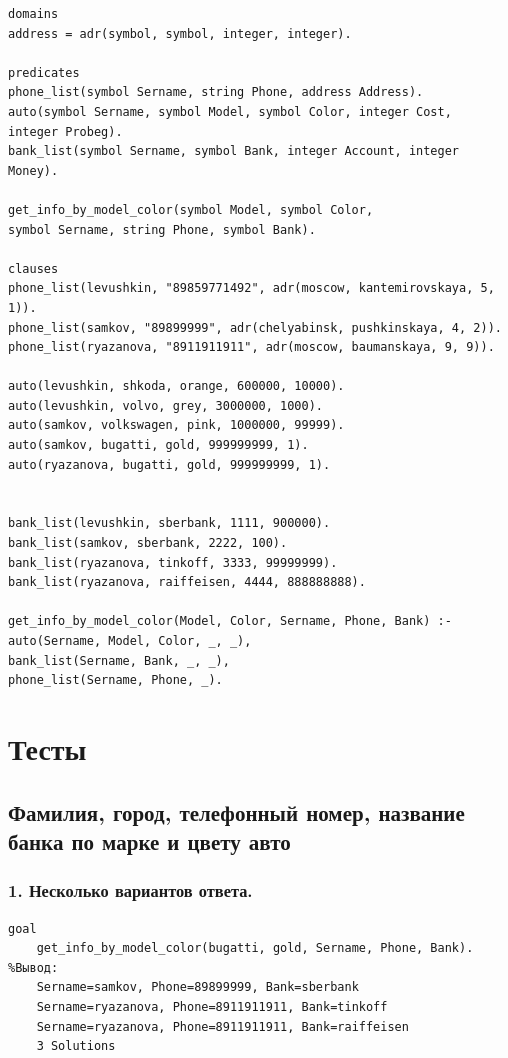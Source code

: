 \documentclass[a4paper,12pt]{article}
\begin{document}
	\begin{verbatim}
domains
address = adr(symbol, symbol, integer, integer).

predicates
phone_list(symbol Sername, string Phone, address Address).
auto(symbol Sername, symbol Model, symbol Color, integer Cost, 
integer Probeg).
bank_list(symbol Sername, symbol Bank, integer Account, integer Money).

get_info_by_model_color(symbol Model, symbol Color, 
symbol Sername, string Phone, symbol Bank).

clauses
phone_list(levushkin, "89859771492", adr(moscow, kantemirovskaya, 5, 1)).
phone_list(samkov, "89899999", adr(chelyabinsk, pushkinskaya, 4, 2)).
phone_list(ryazanova, "8911911911", adr(moscow, baumanskaya, 9, 9)).

auto(levushkin, shkoda, orange, 600000, 10000).
auto(levushkin, volvo, grey, 3000000, 1000).
auto(samkov, volkswagen, pink, 1000000, 99999).
auto(samkov, bugatti, gold, 999999999, 1).
auto(ryazanova, bugatti, gold, 999999999, 1).


bank_list(levushkin, sberbank, 1111, 900000).
bank_list(samkov, sberbank, 2222, 100).
bank_list(ryazanova, tinkoff, 3333, 99999999).
bank_list(ryazanova, raiffeisen, 4444, 888888888).

get_info_by_model_color(Model, Color, Sername, Phone, Bank) :-
auto(Sername, Model, Color, _, _), 
bank_list(Sername, Bank, _, _),
phone_list(Sername, Phone, _).
	\end{verbatim}
	
	\newpage
	
	\section*{Тесты}
	
	\subsection*{Фамилия, город, телефонный номер, название банка по марке и цвету авто}
	
	\subsubsection*{1. Несколько вариантов ответа.}
	
	\begin{verbatim}
goal
	get_info_by_model_color(bugatti, gold, Sername, Phone, Bank).
%Вывод:
	Sername=samkov, Phone=89899999, Bank=sberbank
	Sername=ryazanova, Phone=8911911911, Bank=tinkoff
	Sername=ryazanova, Phone=8911911911, Bank=raiffeisen
	3 Solutions
	\end{verbatim}
	
\end{document}
